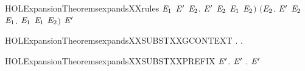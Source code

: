 \begin{SaveVerbatim}{HOLExpansionTheoremsexpandsXXrules}
            \ensuremath{\HOLBoundVar{E}\sb{\mathrm{1}}}  \ensuremath{\HOLBoundVar{E}\sp{\prime}} \HOLSymConst{\HOLTokenDisj{}} \HOLSymConst{\HOLTokenExists{}}\ensuremath{\HOLBoundVar{E}\sb{\mathrm{2}}}. \ensuremath{\HOLBoundVar{E}\sp{\prime}} \HOLTokenTransBegin\HOLConst{\ensuremath{\tau}}\HOLTokenTransEnd \ensuremath{\HOLBoundVar{E}\sb{\mathrm{2}}} \HOLSymConst{\HOLTokenConj{}} \ensuremath{\HOLBoundVar{E}\sb{\mathrm{1}}}  \ensuremath{\HOLBoundVar{E}\sb{\mathrm{2}}}\ensuremath{)} \HOLSymConst{\HOLTokenConj{}}
       \ensuremath{(}\HOLSymConst{\HOLTokenForall{}}\ensuremath{\HOLBoundVar{E}\sb{\mathrm{2}}}. \ensuremath{\HOLBoundVar{E}\sp{\prime}} \HOLTokenTransBegin\HOLConst{\ensuremath{\tau}}\HOLTokenTransEnd \ensuremath{\HOLBoundVar{E}\sb{\mathrm{2}}} \HOLSymConst{\HOLTokenImp{}} \HOLSymConst{\HOLTokenExists{}}\ensuremath{\HOLBoundVar{E}\sb{\mathrm{1}}}.  \HOLTokenWeakTransBegin\HOLConst{\ensuremath{\tau}}\HOLTokenWeakTransEnd \ensuremath{\HOLBoundVar{E}\sb{\mathrm{1}}} \HOLSymConst{\HOLTokenConj{}} \ensuremath{\HOLBoundVar{E}\sb{\mathrm{1}}}  \ensuremath{\HOLBoundVar{E}\sb{\mathrm{2}}}\ensuremath{)} \HOLSymConst{\HOLTokenImp{}}
         \ensuremath{\HOLBoundVar{E}\sp{\prime}}
\end{SaveVerbatim}
\newcommand{\HOLExpansionTheoremsexpandsXXrules}{\UseVerbatim{HOLExpansionTheoremsexpandsXXrules}}
\begin{SaveVerbatim}{HOLExpansionTheoremsexpandsXXSUBSTXXGCONTEXT}
\HOLTokenTurnstile{} \HOLSymConst{\HOLTokenForall{}} .    \HOLSymConst{\HOLTokenImp{}} \HOLSymConst{\HOLTokenForall{}}.   \HOLSymConst{\HOLTokenImp{}}     
\end{SaveVerbatim}
\newcommand{\HOLExpansionTheoremsexpandsXXSUBSTXXGCONTEXT}{\UseVerbatim{HOLExpansionTheoremsexpandsXXSUBSTXXGCONTEXT}}
\begin{SaveVerbatim}{HOLExpansionTheoremsexpandsXXSUBSTXXPREFIX}
\HOLTokenTurnstile{} \HOLSymConst{\HOLTokenForall{}} \ensuremath{\HOLBoundVar{E}\sp{\prime}}.   \ensuremath{\HOLBoundVar{E}\sp{\prime}} \HOLSymConst{\HOLTokenImp{}} \HOLSymConst{\HOLTokenForall{}}. \HOLSymConst{\ensuremath{\ldotp}}  \HOLSymConst{\ensuremath{\ldotp}}\ensuremath{\HOLBoundVar{E}\sp{\prime}}
\end{SaveVerbatim}
